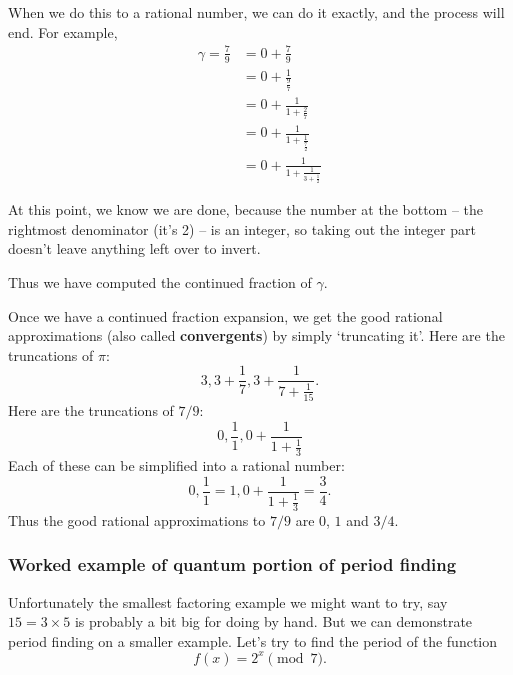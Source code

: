 \documentclass{article}
\theoremstyle{plain}
\theoremstyle{definition}
\theoremstyle{remark}
\numberwithin{theorem}{section}
\begin{document}
 When we do this to a rational number, we can do it exactly, and the process will end.  For example,
  \begin{align*}
 \gamma = \frac{7}{9} &= 0 + \frac{7}{9} \\
 &= 0 + \frac{1}{ \frac{9}{7} } \\
  &= 0 + \frac{1}{1 +  \frac{2}{7} } \\
  &= 0 + \frac{1}{1 + \frac{1}{ \frac{7}{2} }} \\
  &= 0 + \frac{1}{1 + \frac{1}{ 3 + \frac{1}{2} }} 
 \end{align*}

 At this point, we know we are done, because the number at the bottom -- the rightmost denominator (it's 2) -- is an integer, so taking out the integer part doesn't leave anything left over to invert.

 Thus we have computed the continued fraction of $\gamma$.

 Once we have a continued fraction expansion, we get the good rational approximations (also called \textbf{convergents}) by simply `truncating it'.  Here are the truncations of $\pi$:
 \[
 3 ,  3 + \frac{1}{7} , 3 + \frac{1}{7 + \frac{1}{15}}.
 \]
 Here are the truncations of $7/9$:
 \[
 0 , \frac{1}{ 1}
 , 0 + \frac{1}{1 + \frac{1}{ 3 }}
 \]
 Each of these can be simplified into a rational number:
  \[
 0 , \frac{1}{ 1} = 1
 , 0 + \frac{1}{1 + \frac{1}{ 3 }} = \frac{3}{4}.
 \]
 Thus the good rational approximations to $7/9$ are $0$, $1$ and $3/4$.


 \subsubsection{Worked example of quantum portion of period finding}

 Unfortunately the smallest factoring example we might want to try, say $15 = 3 \times 5$ is probably a bit big for doing by hand.  But we can demonstrate period finding on a smaller example.  Let's try to find the period of the function
 \[
 f(x) = 2^x \pmod{7}.
 \]
\end{document}
